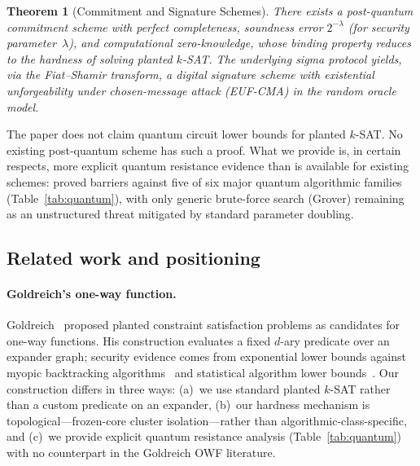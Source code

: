 \documentclass[11pt]{article}
\newtheorem{theorem}{Theorem}
\begin{document}
\begin{theorem}[Commitment and Signature Schemes]\label{thm:commit}
There exists a post-quantum commitment scheme with perfect completeness, soundness error $2^{-\lambda}$ (for security parameter~$\lambda$), and computational zero-knowledge, whose binding property reduces to the hardness of solving planted $k$-SAT.  The underlying sigma protocol yields, via the Fiat--Shamir transform, a digital signature scheme with existential unforgeability under chosen-message attack (EUF-CMA) in the random oracle model.
\end{theorem}

The paper does not claim quantum circuit lower bounds for planted $k$-SAT.  No existing post-quantum scheme has such a proof.  What we provide is, in certain respects, more explicit quantum resistance evidence than is available for existing schemes: proved barriers against five of six major quantum algorithmic families (Table~\ref{tab:quantum}), with only generic brute-force search (Grover) remaining as an unstructured threat mitigated by standard parameter doubling.


\subsection{Related work and positioning}\label{sec:related}

\paragraph{Goldreich's one-way function.}
Goldreich~\cite{Gol00} proposed planted constraint satisfaction problems as candidates for one-way functions.  His construction evaluates a fixed $d$-ary predicate over an expander graph; security evidence comes from exponential lower bounds against myopic backtracking algorithms~\cite{CEMT09} and statistical algorithm lower bounds~\cite{FPV18}.  Our construction differs in three ways: (a)~we use standard planted $k$-SAT rather than a custom predicate on an expander, (b)~our hardness mechanism is topological---frozen-core cluster isolation---rather than algorithmic-class-specific, and (c)~we provide explicit quantum resistance analysis (Table~\ref{tab:quantum}) with no counterpart in the Goldreich OWF literature.
\end{document}
